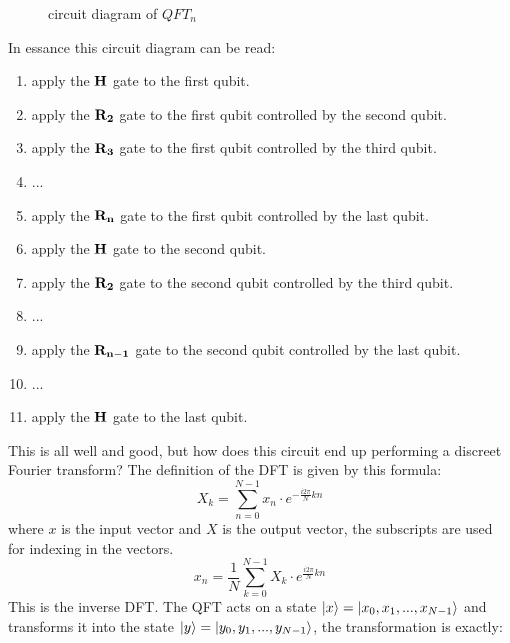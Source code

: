 \begin{figure}[H]
{
    }
    \caption{circuit diagram of $QFT_n$}
    \label{fig:QTF_n}
\end{figure}
In essance this circuit diagram can be read:
\begin{enumerate}
    \item apply the $\mathbf{H}$ gate to the first qubit. 
    \item apply the $\mathbf{R_{2}}$ gate to the first qubit controlled by the second qubit. 
    \item apply the $\mathbf{R_{3}}$ gate to the first qubit controlled by the third qubit. 
    \item ... 
    \item apply the $\mathbf{R_{n}}$ gate to the first qubit controlled by the last qubit. 
    \item apply the $\mathbf{H}$ gate to the second qubit. 
    \item apply the $\mathbf{R_{2}}$ gate to the second qubit controlled by the third qubit. 
    \item ... 
    \item apply the $\mathbf{R_{n-1}}$ gate to the second qubit controlled by the last qubit. 
    \item ... 
    \item apply the $\mathbf{H}$ gate to the last qubit. 
\end{enumerate}
This is all well and good, but how does this circuit end up performing a discreet Fourier transform? The definition of the DFT is given by this formula:
$$X_{k}=\sum _{n=0}^{N-1}x_{n}\cdot e^{-{\frac {i2\pi }{N}}kn}$$
where $x$ is the input vector and $X$ is the output vector, the subscripts are used for indexing in the vectors. 
$$x_{n}={\frac {1}{N}}\sum _{k=0}^{N-1}X_{k}\cdot e^{{\frac {i2\pi }{N}}kn}$$
This is the inverse DFT.
The QFT acts on a state $\ket{x}=\ket{x_0,x_1,...,x_{N-1}}$ and transforms it into the state $\ket{y}=\ket{y_0,y_1,...,y_{N-1}}$, the transformation is exactly: 

